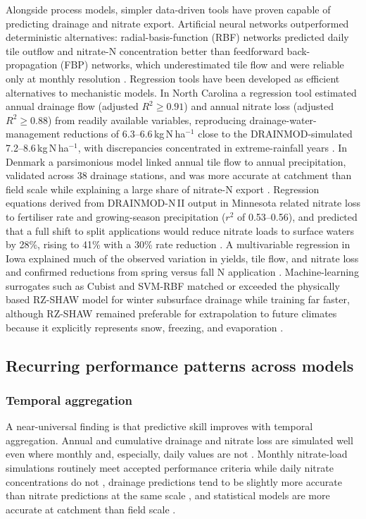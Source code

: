 \documentclass[11pt]{article}
\begin{document}
Alongside process models, simpler data-driven tools have proven capable of predicting drainage and nitrate export. Artificial neural networks outperformed deterministic alternatives: radial-basis-function (RBF) networks predicted daily tile outflow and nitrate-N concentration better than feedforward back-propagation (FBP) networks, which underestimated tile flow and were reliable only at monthly resolution \parencite{Sharma2003,Rudra2005}. Regression tools have been developed as efficient alternatives to mechanistic models. In North Carolina a regression tool estimated annual drainage flow (adjusted $R^2 \geq 0.91$) and annual nitrate loss (adjusted $R^2 \geq 0.88$) from readily available variables, reproducing drainage-water-management reductions of 6.3--6.6\,kg\,N\,ha$^{-1}$ close to the DRAINMOD-simulated 7.2--8.6\,kg\,N\,ha$^{-1}$, with discrepancies concentrated in extreme-rainfall years \parencite{Negm2016}. In Denmark a parsimonious model linked annual tile flow to annual precipitation, validated across 38 drainage stations, and was more accurate at catchment than field scale while explaining a large share of nitrate-N export \parencite{Frederiksen2023}. Regression equations derived from DRAINMOD-N\,II output in Minnesota related nitrate loss to fertiliser rate and growing-season precipitation ($r^2$ of 0.53--0.56), and predicted that a full shift to split applications would reduce nitrate loads to surface waters by 28\%, rising to 41\% with a 30\% rate reduction \parencite{Wilson2020}. A multivariable regression in Iowa explained much of the observed variation in yields, tile flow, and nitrate loss and confirmed reductions from spring versus fall N application \parencite{Ahuja2007}. Machine-learning surrogates such as Cubist and SVM-RBF matched or exceeded the physically based RZ-SHAW model for winter subsurface drainage while training far faster, although RZ-SHAW remained preferable for extrapolation to future climates because it explicitly represents snow, freezing, and evaporation \parencite{Li2025}.

\subsection{Recurring performance patterns across models}

\subsubsection{Temporal aggregation}

A near-universal finding is that predictive skill improves with temporal aggregation. Annual and cumulative drainage and nitrate loss are simulated well even where monthly and, especially, daily values are not \parencite{Liang2018,Marjerison2016,Malone2017,Ojeda2018}. Monthly nitrate-load simulations routinely meet accepted performance criteria while daily nitrate concentrations do not \parencite{Ikenberry2017,Qi2025}, drainage predictions tend to be slightly more accurate than nitrate predictions at the same scale \parencite{Luo2010}, and statistical models are more accurate at catchment than field scale \parencite{Frederiksen2023}.
\end{document}
